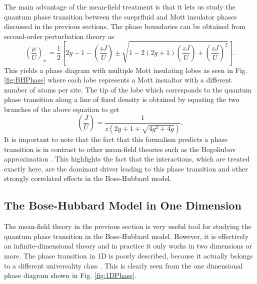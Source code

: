 The main advantage of the mean-field treatment is that it lets us
study the quantum phase transition between the sueprfluid and Mott
insulator phases discussed in the previous sections. The phase
boundaries can be obtained from second-order perturbation theory as 
\begin{equation}
  \left( \frac{\mu} {U} \right)_\pm = \frac{1}{2} \left[ 2g - 1 -
    \left( \frac{zJ}{U} \right) \pm \sqrt{ 1 - 2 (2g + 1) \left( \frac{zJ}{U}
        \right) + \left( \frac{zJ}{U} \right)^2} \right].
\end{equation}
This yields a phase diagram with multiple Mott insulating lobes as
seen in Fig. \ref{fig:BHPhase} where each lobe represents a Mott insualtor with a
different number of atoms per site. The tip of the lobe which
corresponds to the quantum phase transition along a line of fixed
density is obtained by equating the two branches of the above equation
to get
\begin{equation}
  \left( \frac{J} {U} \right) = \frac{1} {z (2g + 1 + \sqrt{4g^2 + 4g} )}.
\end{equation}
It is important to note that the fact that this formalism predicts a
phase transition is in contrast to other mean-field theories such as
the Bogoliubov approximation \cite{PitaevskiiStringari}. This
highlights the fact that the interactions, which are treated exactly
here, are the dominant driver leading to this phase transition and
other strongly correlated effects in the Bose-Hubbard model.

\subsection{The Bose-Hubbard Model in One Dimension}
\label{sec:BHM1D}

The mean-field theory in the previous section is very useful tool for
studying the quantum phase transition in the Bose-Hubbard
model. However, it is effectively an infinite-dimensional theory and
in practice it only works in two dimensions or more. The phase
transition in 1D is poorly described, because it actually belongs to a
different universality class \cite{cazalilla2011, ejima2011,
  kuhner2000, pino2012, pino2013}. This is clearly seen from the one
dimensional phase diagram shown in Fig. \ref{fig:1DPhase}.

